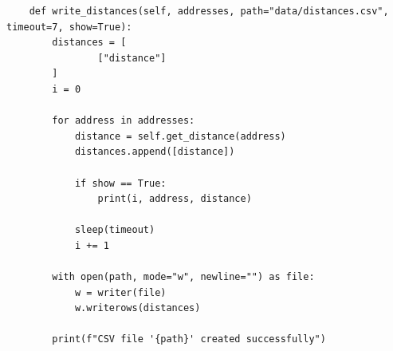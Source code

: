 \documentclass[12pt]{article}
\begin{document}
\begin{lstlisting}
    def write_distances(self, addresses, path="data/distances.csv", timeout=7, show=True):
        distances = [
                ["distance"]
        ]
        i = 0

        for address in addresses:
            distance = self.get_distance(address)
            distances.append([distance])

            if show == True:
                print(i, address, distance)

            sleep(timeout)
            i += 1
        
        with open(path, mode="w", newline="") as file:
            w = writer(file)
            w.writerows(distances)

        print(f"CSV file '{path}' created successfully")
\end{lstlisting}
\end{document}
